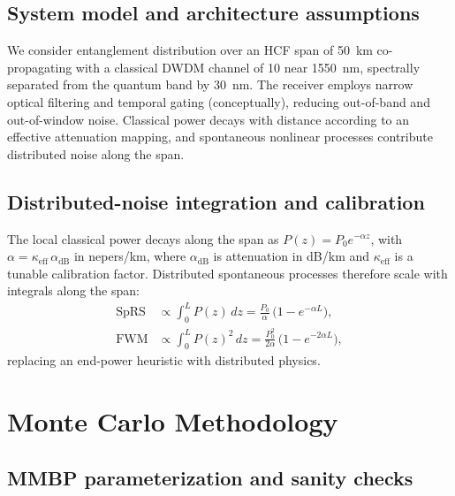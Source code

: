 \documentclass{article}
\newcommand{\simL}{50}
\newcommand{\simpcl}{10}
\newcommand{\simsep}{30}
\begin{document}
\subsection{System model and architecture assumptions}

We consider entanglement distribution over an HCF span of \SI{\simL}{\kilo\meter} co-propagating with a classical DWDM channel of \SI{\simpcl}{\dBm} near \SI{1550}{\nano\meter}, spectrally separated from the quantum band by \SI{\simsep}{\nano\meter}. The receiver employs narrow optical filtering and temporal gating (conceptually), reducing out-of-band and out-of-window noise. Classical power decays with distance according to an effective attenuation mapping, and spontaneous nonlinear processes contribute distributed noise along the span.

\subsection{Distributed-noise integration and calibration}\label{sec:calib}

The local classical power decays along the span as $P(z)=P_0 e^{-\alpha z}$, with $\alpha = \kappa_{\mathrm{eff}}\,\alpha_{\mathrm{dB}}$ in nepers/km, where $\alpha_{\mathrm{dB}}$ is attenuation in dB/km and $\kappa_{\mathrm{eff}}$ is a tunable calibration factor. Distributed spontaneous processes therefore scale with integrals along the span:
\begin{align}
\mathrm{SpRS} &\propto \int_0^L P(z)\,dz = \frac{P_0}{\alpha}\,\big(1-e^{-\alpha L}\big),\\
\mathrm{FWM} &\propto \int_0^L P(z)^2\,dz = \frac{P_0^2}{2\alpha}\,\big(1-e^{-2\alpha L}\big),
\end{align}
replacing an end-power heuristic with distributed physics.

\section{Monte Carlo Methodology}

\subsection{MMBP parameterization and sanity checks}\label{sec:mmbp-param}
\end{document}
